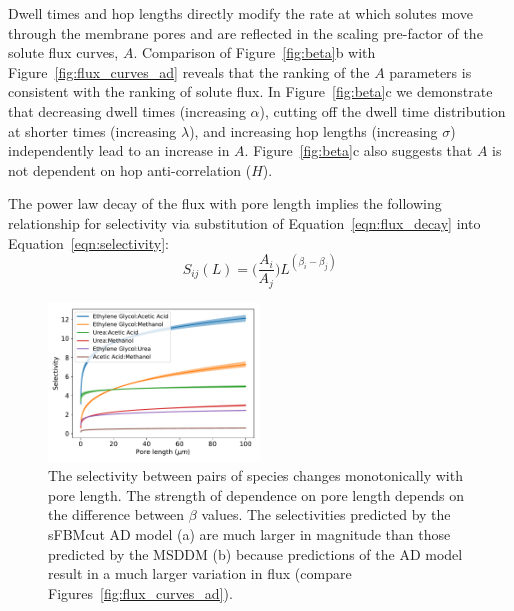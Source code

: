 \documentclass[aps,pre,preprint,groupedaddress]{revtex4-2}
\begin{document}

  Dwell times and hop lengths directly modify the rate at which solutes move 
  through the membrane pores and are reflected in the scaling pre-factor of
  the solute flux curves, $A$. Comparison of Figure~\ref{fig:beta}b with 
  Figure~\ref{fig:flux_curves_ad} reveals that the ranking of the $A$ parameters
  is consistent with the ranking of solute flux. In Figure~\ref{fig:beta}c we
  demonstrate that decreasing dwell times (increasing $\alpha$), cutting off 
  the dwell time distribution at shorter times (increasing $\lambda$), and increasing 
  hop lengths (increasing $\sigma$) independently lead to an increase in $A$. 
  Figure~\ref{fig:beta}c also suggests that $A$ is not dependent on hop 
  anti-correlation ($H$).
  
  The power law decay of the flux with pore length implies the following relationship
  for selectivity via substitution of Equation~\ref{eqn:flux_decay} into 
  Equation~\ref{eqn:selectivity}:
  \begin{equation}
  S_{ij}(L) = \bigg(\frac{A_i}{A_j}\bigg)L^{(\beta_i - \beta_j)}
  \label{eqn:selectivity_ratio}
  \end{equation}

  \begin{figure}
  \centering
  \includegraphics[width=0.5\textwidth]{selectivity.pdf}
  
  \caption{The selectivity 
    between pairs of species
    changes monotonically with pore length. The
  strength of dependence on pore length depends on the difference between $\beta$ values.
  The selectivities predicted by the sFBMcut AD model (a) are much larger in magnitude than
  those predicted by the MSDDM (b) because predictions of the AD model result in a much
  larger variation in flux (compare Figures~\ref{fig:flux_curves_ad}).}
  \label{fig:selectivity}
  \end{figure}
   
\end{document}

